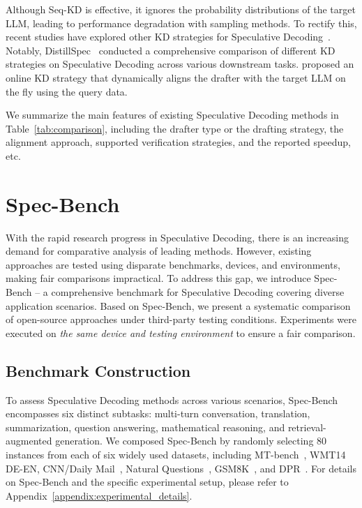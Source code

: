Although Seq-KD is effective, it ignores the probability distributions of the target LLM, leading to performance degradation with sampling methods. To rectify this, recent studies have explored other KD strategies for Speculative Decoding~\cite{Zhou:2023distillspec, Liu:2023onlinespec}. Notably, DistillSpec~\cite{Zhou:2023distillspec} conducted a comprehensive comparison of different KD strategies on Speculative Decoding across various downstream tasks. \citet{Liu:2023onlinespec} proposed an online KD strategy that dynamically aligns the drafter with the target LLM on the fly using the query data.

We summarize the main features of existing Speculative Decoding methods in Table~\ref{tab:comparison}, including the drafter type or the drafting strategy, the alignment approach, supported verification strategies, and the reported speedup, etc. 

\section{Spec-Bench}
\label{sec:comparisons}

With the rapid research progress in Speculative Decoding, there is an increasing demand for comparative analysis of leading methods. However, existing approaches are tested using disparate benchmarks, devices, and environments, making fair comparisons impractical. To address this gap, we introduce Spec-Bench -- a comprehensive benchmark for Speculative Decoding covering diverse application scenarios. Based on Spec-Bench, we present a systematic comparison of open-source approaches under third-party testing conditions. Experiments were executed on \textit{the same device and testing environment} to ensure a fair comparison.

\subsection{Benchmark Construction} To assess Speculative Decoding methods across various scenarios, Spec-Bench encompasses six distinct subtasks: multi-turn conversation, translation, summarization, question answering, mathematical reasoning, and retrieval-augmented generation. We composed Spec-Bench by randomly selecting 80 instances from each of six widely used datasets, including MT-bench~\cite{zheng2023mtbench}, WMT14 DE-EN, CNN/Daily Mail~\cite{Nallapati:2016cnndm}, Natural Questions~\cite{kwiatkowski2019:naturalquestions}, GSM8K~\cite{Cobbe:2021gsm8k}, and DPR~\cite{Karpukhin:2020dpr}. For details on Spec-Bench and the specific experimental setup, please refer to Appendix~\ref{appendix:experimental_details}.


